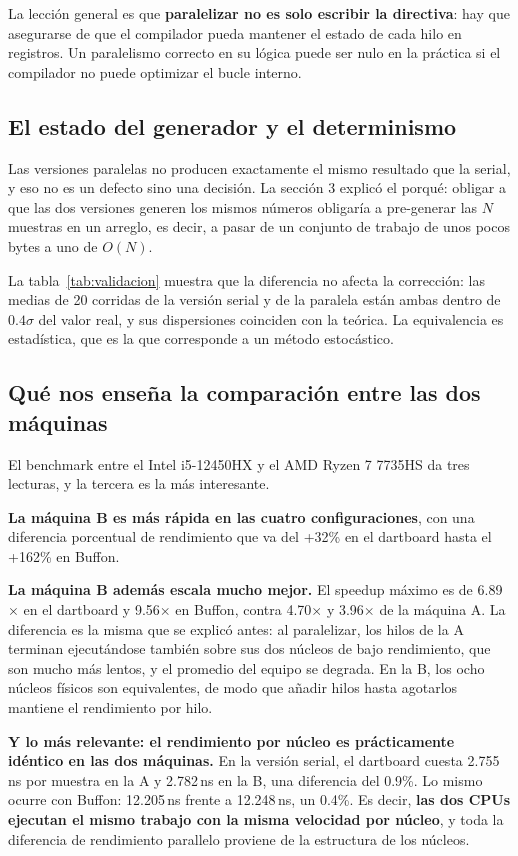 La lección general es que \textbf{paralelizar no es solo escribir la directiva}: hay que asegurarse de que el compilador pueda mantener el estado de cada hilo en registros. Un paralelismo correcto en su lógica puede ser nulo en la práctica si el compilador no puede optimizar el bucle interno.

\subsection{El estado del generador y el determinismo}

Las versiones paralelas no producen exactamente el mismo resultado que la serial, y eso no es un defecto sino una decisión. La sección 3 explicó el porqué: obligar a que las dos versiones generen los mismos números obligaría a pre-generar las $N$ muestras en un arreglo, es decir, a pasar de un conjunto de trabajo de unos pocos bytes a uno de $O(N)$.

La tabla~\ref{tab:validacion} muestra que la diferencia no afecta la corrección: las medias de 20 corridas de la versión serial y de la paralela están ambas dentro de $0.4\sigma$ del valor real, y sus dispersiones coinciden con la teórica. La equivalencia es estadística, que es la que corresponde a un método estocástico.

\subsection{Qué nos enseña la comparación entre las dos máquinas}

El benchmark entre el Intel i5-12450HX y el AMD Ryzen 7 7735HS da tres lecturas, y la tercera es la más interesante.

\textbf{La máquina B es más rápida en las cuatro configuraciones}, con una diferencia porcentual de rendimiento que va del +32\% en el dartboard hasta el +162\% en Buffon.

\textbf{La máquina B además escala mucho mejor.} El speedup máximo es de 6.89$\times$ en el dartboard y 9.56$\times$ en Buffon, contra 4.70$\times$ y 3.96$\times$ de la máquina A. La diferencia es la misma que se explicó antes: al paralelizar, los hilos de la A terminan ejecutándose también sobre sus dos núcleos de bajo rendimiento, que son mucho más lentos, y el promedio del equipo se degrada. En la B, los ocho núcleos físicos son equivalentes, de modo que añadir hilos hasta agotarlos mantiene el rendimiento por hilo.

\textbf{Y lo más relevante: el rendimiento por núcleo es prácticamente idéntico en las dos máquinas.} En la versión serial, el dartboard cuesta 2.755\,ns por muestra en la A y 2.782\,ns en la B, una diferencia del 0.9\%. Lo mismo ocurre con Buffon: 12.205\,ns frente a 12.248\,ns, un 0.4\%. Es decir, \textbf{las dos CPUs ejecutan el mismo trabajo con la misma velocidad por núcleo}, y toda la diferencia de rendimiento parallelo proviene de la estructura de los núcleos.


